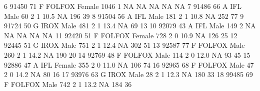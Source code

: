 \documentclass[
]{book}
\newenvironment{Shaded}{\begin{snugshade}}{\end{snugshade}}
\newcommand{\DecValTok}[1]{\textcolor[rgb]{0.00,0.00,0.81}{#1}}
\newcommand{\FloatTok}[1]{\textcolor[rgb]{0.00,0.00,0.81}{#1}}
\newcommand{\NormalTok}[1]{#1}
\newcommand{\OtherTok}[1]{\textcolor[rgb]{0.56,0.35,0.01}{#1}}
\begin{document}
\begin{Shaded}
\begin{Highlighting}[]
\DecValTok{6}   \DecValTok{91450}  \DecValTok{71}\NormalTok{ F FOLFOX Female   }\DecValTok{1046}      \DecValTok{1} \OtherTok{NA}   \OtherTok{NA}        \OtherTok{NA}      \OtherTok{NA}  \OtherTok{NA}
\DecValTok{7}   \DecValTok{91486}  \DecValTok{66}\NormalTok{    A IFL   Male     }\DecValTok{60}      \DecValTok{2}  \DecValTok{1} \FloatTok{10.5}        \OtherTok{NA}     \DecValTok{196}  \DecValTok{39}
\DecValTok{8}   \DecValTok{91504}  \DecValTok{56}\NormalTok{    A IFL   Male    }\DecValTok{181}      \DecValTok{2}  \DecValTok{1} \FloatTok{10.8}        \OtherTok{NA}     \DecValTok{252}  \DecValTok{77}
\DecValTok{9}   \DecValTok{91724}  \DecValTok{50}\NormalTok{   G IROX   Male    }\DecValTok{481}      \DecValTok{2}  \DecValTok{1} \FloatTok{13.4}        \OtherTok{NA}      \DecValTok{69}  \DecValTok{13}
\DecValTok{10}  \DecValTok{92079}  \DecValTok{43}\NormalTok{    A IFL   Male    }\DecValTok{149}      \DecValTok{2} \OtherTok{NA}   \OtherTok{NA}        \OtherTok{NA}      \OtherTok{NA}  \OtherTok{NA}
\DecValTok{11}  \DecValTok{92420}  \DecValTok{51}\NormalTok{ F FOLFOX Female    }\DecValTok{728}      \DecValTok{2}  \DecValTok{0} \FloatTok{10.9}        \OtherTok{NA}     \DecValTok{126}  \DecValTok{25}
\DecValTok{12}  \DecValTok{92445}  \DecValTok{51}\NormalTok{   G IROX   Male    }\DecValTok{751}      \DecValTok{2}  \DecValTok{1} \FloatTok{12.4}        \OtherTok{NA}     \DecValTok{302}  \DecValTok{51}
\DecValTok{13}  \DecValTok{92587}  \DecValTok{77}\NormalTok{ F FOLFOX   Male    }\DecValTok{260}      \DecValTok{2}  \DecValTok{1} \FloatTok{14.2}        \OtherTok{NA}     \DecValTok{190}  \DecValTok{20}
\DecValTok{14}  \DecValTok{92769}  \DecValTok{48}\NormalTok{ F FOLFOX   Male    }\DecValTok{114}      \DecValTok{2}  \DecValTok{0} \FloatTok{12.0}        \OtherTok{NA}      \DecValTok{93}  \DecValTok{45}
\DecValTok{15}  \DecValTok{92886}  \DecValTok{47}\NormalTok{    A IFL Female    }\DecValTok{355}      \DecValTok{2}  \DecValTok{0} \FloatTok{11.0}        \OtherTok{NA}     \DecValTok{106}  \DecValTok{74}
\DecValTok{16}  \DecValTok{92965}  \DecValTok{68}\NormalTok{ F FOLFOX   Male     }\DecValTok{47}      \DecValTok{2}  \DecValTok{0} \FloatTok{14.2}        \OtherTok{NA}      \DecValTok{80}  \DecValTok{16}
\DecValTok{17}  \DecValTok{93976}  \DecValTok{63}\NormalTok{   G IROX   Male     }\DecValTok{28}      \DecValTok{2}  \DecValTok{1} \FloatTok{12.3}        \OtherTok{NA}     \DecValTok{180}  \DecValTok{33}
\DecValTok{18}  \DecValTok{99485}  \DecValTok{69}\NormalTok{ F FOLFOX   Male    }\DecValTok{742}      \DecValTok{2}  \DecValTok{1} \FloatTok{13.2}        \OtherTok{NA}     \DecValTok{184}  \DecValTok{36}

\end{Highlighting}
\end{Shaded}
\end{document}
